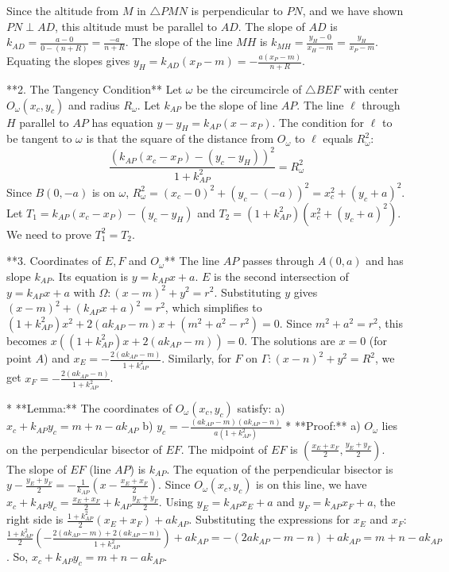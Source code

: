 Since the altitude from $M$ in $\triangle PMN$ is perpendicular to $PN$, and we have shown $PN \perp AD$, this altitude must be parallel to $AD$.
The slope of $AD$ is $k_{AD} = \frac{a-0}{0-(n+R)} = \frac{-a}{n+R}$. The slope of the line $MH$ is $k_{MH} = \frac{y_H-0}{x_H-m} = \frac{y_H}{x_P-m}$.
Equating the slopes gives $y_H = k_{AD}(x_P-m) = -\frac{a(x_P-m)}{n+R}$.

**2. The Tangency Condition**
Let $\omega$ be the circumcircle of $\triangle BEF$ with center $O_\omega(x_c, y_c)$ and radius $R_\omega$. Let $k_{AP}$ be the slope of line $AP$. The line $\ell$ through $H$ parallel to $AP$ has equation $y-y_H = k_{AP}(x-x_P)$. The condition for $\ell$ to be tangent to $\omega$ is that the square of the distance from $O_\omega$ to $\ell$ equals $R_\omega^2$:
$$ \frac{(k_{AP}(x_c-x_P) - (y_c-y_H))^2}{1+k_{AP}^2} = R_\omega^2 $$
Since $B(0,-a)$ is on $\omega$, $R_\omega^2 = (x_c-0)^2+(y_c-(-a))^2 = x_c^2+(y_c+a)^2$.
Let $T_1 = k_{AP}(x_c-x_P) - (y_c-y_H)$ and $T_2 = (1+k_{AP}^2)(x_c^2 + (y_c+a)^2)$. We need to prove $T_1^2 = T_2$.

**3. Coordinates of $E, F$ and $O_\omega$**
The line $AP$ passes through $A(0,a)$ and has slope $k_{AP}$. Its equation is $y=k_{AP}x+a$.
$E$ is the second intersection of $y=k_{AP}x+a$ with $\Omega: (x-m)^2+y^2=r^2$. Substituting $y$ gives $(x-m)^2+(k_{AP}x+a)^2=r^2$, which simplifies to $(1+k_{AP}^2)x^2+2(ak_{AP}-m)x+(m^2+a^2-r^2)=0$. Since $m^2+a^2=r^2$, this becomes $x((1+k_{AP}^2)x+2(ak_{AP}-m))=0$. The solutions are $x=0$ (for point $A$) and $x_E = -\frac{2(ak_{AP}-m)}{1+k_{AP}^2}$.
Similarly, for $F$ on $\Gamma: (x-n)^2+y^2=R^2$, we get $x_F = -\frac{2(ak_{AP}-n)}{1+k_{AP}^2}$.

*   **Lemma:** The coordinates of $O_\omega(x_c, y_c)$ satisfy:
    a) $x_c+k_{AP}y_c = m+n-ak_{AP}$
    b) $y_c = -\frac{(ak_{AP}-m)(ak_{AP}-n)}{a(1+k_{AP}^2)}$
*   **Proof:**
    a) $O_\omega$ lies on the perpendicular bisector of $EF$. The midpoint of $EF$ is $(\frac{x_E+x_F}{2}, \frac{y_E+y_F}{2})$. The slope of $EF$ (line $AP$) is $k_{AP}$. The equation of the perpendicular bisector is $y-\frac{y_E+y_F}{2} = -\frac{1}{k_{AP}}(x-\frac{x_E+x_F}{2})$. Since $O_\omega(x_c, y_c)$ is on this line, we have $x_c+k_{AP}y_c = \frac{x_E+x_F}{2}+k_{AP}\frac{y_E+y_F}{2}$. Using $y_E=k_{AP}x_E+a$ and $y_F=k_{AP}x_F+a$, the right side is $\frac{1+k_{AP}^2}{2}(x_E+x_F)+ak_{AP}$. Substituting the expressions for $x_E$ and $x_F$:
    $\frac{1+k_{AP}^2}{2} \left(-\frac{2(ak_{AP}-m)+2(ak_{AP}-n)}{1+k_{AP}^2}\right) + ak_{AP} = -(2ak_{AP}-m-n)+ak_{AP} = m+n-ak_{AP}$.
    So, $x_c+k_{AP}y_c = m+n-ak_{AP}$.

